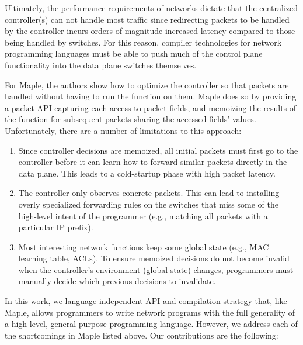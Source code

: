 \documentclass[preprint]{sigplanconf}
\begin{document}
Ultimately, the performance requirements of networks dictate that the centralized controller(s) can not handle most traffic since redirecting packets to be handled by the controller incurs orders of magnitude increased latency compared to those being handled by switches. For this reason, compiler technologies for network programming languages must be able to push much of the control plane functionality into the data plane switches themselves. 

For Maple, the authors show how to optimize the controller so that packets are handled without having to run the function on them. Maple does so by providing a packet API capturing each access to packet fields, and memoizing the results of the function for subsequent packets sharing the accessed fields' values. Unfortunately, there are a number of limitations to this approach:


\begin{enumerate}
\item Since controller decisions are memoized, all initial packets must first go to the controller before it can learn how to forward similar packets directly in the data plane. This leads to a cold-startup phase with high packet latency.
\item The controller only observes concrete packets. This can lead to installing overly specialized forwarding rules on the switches that miss some of the high-level intent of the programmer (e.g., matching all packets with a particular IP prefix).
\item Most interesting network functions keep some global state (e.g., MAC learning table, ACLs). To ensure memoized decisions do not become invalid when the controller's environment (global state) changes, programmers must manually decide which previous decisions to invalidate.
\end{enumerate}


In this work, we language-independent API and compilation strategy that, like Maple, allows programmers to write network programs with the full generality of a high-level, general-purpose programming language.
However, we address each of the shortcomings in Maple listed above. Our contributions are the following:
\end{document}
